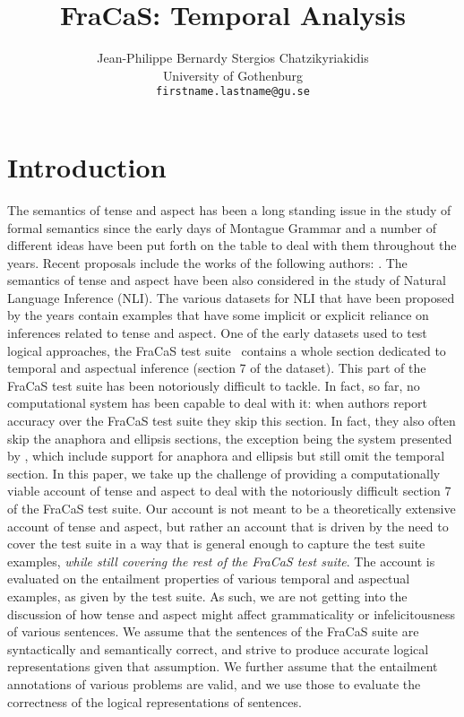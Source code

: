 \documentclass[a4paper,11pt]{article}
\title{FraCaS: Temporal Analysis}
\author{Jean-Philippe Bernardy \qquad Stergios Chatzikyriakidis \\
  University of Gothenburg\\
  {\tt firstname.lastname@gu.se} \\}
\date{}
\begin{document}
\maketitle

\section{Introduction}
\label{sec:introduction}

The semantics of tense and aspect has been a long standing issue in
the study of formal semantics since the early days of Montague Grammar
and a number of different ideas have been put forth on the table to
deal with them throughout the years. Recent proposals include the
works of the following authors:
\citet{dowty:2012,prior:2003,steedman:2000,higginbotham:2009,fernando:2015}.
%
The
semantics of tense and aspect have been also considered in the study of
Natural Language Inference (NLI). The various datasets
for NLI that have been proposed by the years contain examples that
have some implicit or explicit reliance on inferences related to tense
and aspect. One of the early datasets used to test logical approaches,
the FraCaS test suite~\citep{cooper:1996} contains a whole section
dedicated to temporal and aspectual inference (section 7 of the dataset). This part
of the FraCaS test suite has been notoriously difficult to tackle. In
fact, so far, no computational system has been capable to deal with it: when
authors report accuracy over the FraCaS test suite they
skip this section.
%
In fact, they also often skip the anaphora and ellipsis sections, the
exception being the system presented by
\citet{bernardy_type-theoretical_2017,bernardy_wide-coverage_2019},
which include support for anaphora and ellipsis but still omit the
temporal section.
%
In this paper, we take up the challenge of providing a
computationally viable account of tense and aspect to deal with the
notoriously difficult section 7 of the FraCaS test suite. Our account is not meant
to be a theoretically extensive account of tense and aspect, but rather an
account that is driven by the need to cover the test suite in a way
that is general enough to capture the test suite examples, \emph{while still covering the rest of the FraCaS test suite}.
%
The account is evaluated on the entailment properties of various
temporal and aspectual examples, as given by the test suite. As such,
we are not getting into the discussion of how tense and aspect might
affect grammaticality or infelicitousness of various sentences.
We assume that the sentences of the FraCaS suite are syntactically and
semantically correct, and strive to produce accurate logical
representations given that assumption. We further assume that the
entailment annotations of various problems are valid, and we use those
to evaluate the correctness of the logical representations of
sentences.
\end{document}
